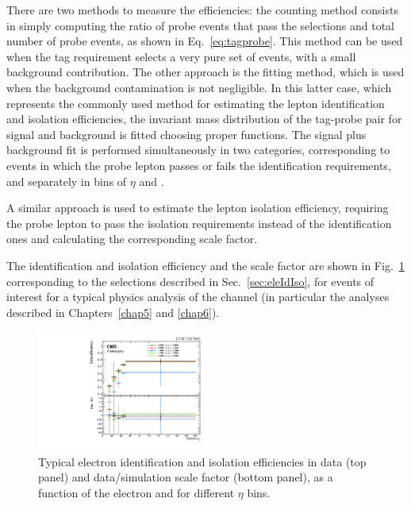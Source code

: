 There are two methods to measure the efficiencies: the counting method consists in simply computing the ratio of probe events that pass the selections and total number of probe events, as shown in Eq.~\eqref{eq:tagprobe}. This method can be used when the tag requirement selects a very pure set of events, with a small background contribution. The other approach is the fitting method, which is used when the background contamination is not negligible. In this latter case, which represents the commonly used method for estimating the lepton identification and isolation efficiencies, the invariant mass distribution of the tag-probe pair for signal and background is fitted choosing proper functions. The signal plus background fit is performed simultaneously in two categories, corresponding to events in which the probe lepton passes or fails the identification requirements, and separately in bins of $\eta$ and \pt.

A similar approach is used to estimate the lepton isolation efficiency, requiring the probe lepton to pass the isolation requirements instead of the identification ones and calculating the corresponding scale factor.

The identification and isolation efficiency and the scale factor are shown in Fig.~\ref{fig:eleIdIso} corresponding to the selections described in Sec.~\ref{sec:eleIdIso}, for events of interest for a typical physics analysis of the \hwwllnn channel (in particular the analyses described in Chapters~\ref{chap5} and \ref{chap6}).

\begin{figure}[htb]
\centering
\includegraphics[width=0.5\textwidth]{images/effEleIdIso.pdf}
\caption{Typical electron identification and isolation efficiencies in data (top panel) and data/simulation scale factor (bottom panel), as a function of the electron \pt and for different $\eta$ bins.}\label{fig:eleIdIso}
\end{figure}
	
